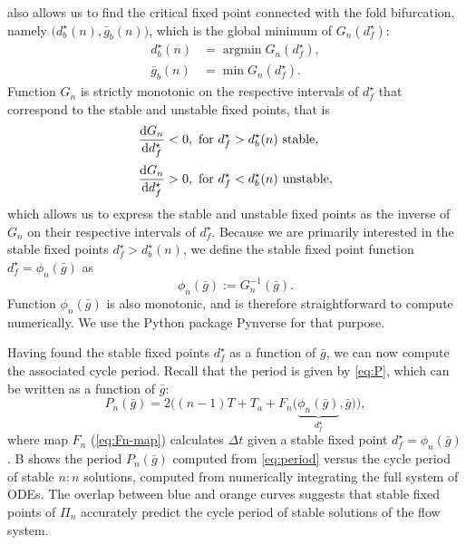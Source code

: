  also allows us to find the critical fixed point connected with the fold bifurcation, namely $\big(d^\star_b(n), \bar g_b(n)\big)$, which is the global minimum
of $G_n(d^\star_f)$:
\begin{align}
	d^\star_b(n) & = \operatorname{argmin} G_n(d^\star_f), \\
	\bar g_b(n)  & = \min{G_n(d^\star_f)}.
\end{align}
Function $G_n$ is strictly monotonic on the respective intervals of $d^\star_f$ that correspond to the stable and unstable fixed points, that is
\begin{align}
	\dv{G_n}{d^\star_f} & < 0, \text{ for } d^\star_f>d^\star_b(n) \text{ stable},   \\[0.5ex]
	\dv{G_n}{d^\star_f} & > 0, \text{ for } d^\star_f<d^\star_b(n) \text{ unstable},
\end{align}
which allows us to express the stable and unstable fixed points as the inverse of $G_n$ on their respective intervals of $d^\star_f$.
Because we are primarily interested in the stable fixed points $d^\star_f>d^\star_b(n)$, we define the stable fixed point function $d^\star_f = \phi_n(\bar g)$ as
\begin{equation}
	\label{eq:phi}
	\phi_n(\bar g):= G_n^{-1}(\bar g).
\end{equation}
Function $\phi_n(\bar g)$ is also monotonic, and is therefore straightforward to compute numerically.
We use the Python package Pynverse \citep{pynverse} for that purpose.

Having found the stable fixed points $d^\star_f$ as a function of $\bar g$, we can now compute the associated cycle period.
Recall that the period is given by \cref{eq:P}, which can be written as a function of $\bar g$:
\begin{equation}
	\label{eq:period}
	P_n(\bar g) = 2 \Big(
	(n-1)T + T_{a} + F_n\big(\underbrace{\phi_n(\bar g)}_{d^\star_f}, \bar g\big)
	\Big),
\end{equation}
where map $F_n$ (\cref{eq:Fn-map}) calculates $\Delta t$ given a stable fixed point $d^\star_f=\phi_n(\bar g)$.
B shows the period $P_{n}(\bar g)$ computed from \cref{eq:period} versus the cycle period of stable $n:n$ solutions, computed from numerically integrating the full system of ODEs.
The overlap between blue and orange curves suggests that stable fixed points of $\Pi_{n}$ accurately predict the cycle period of stable solutions of the flow system.

